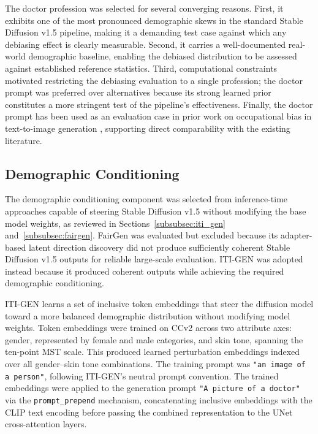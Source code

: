 The doctor profession was selected for several converging reasons. First, it exhibits one of the most pronounced demographic skews in the standard Stable Diffusion v1.5 pipeline, making it a demanding test case against which any debiasing effect is clearly measurable. Second, it carries a well-documented real-world demographic baseline, enabling the debiased distribution to be assessed against established reference statistics. Third, computational constraints motivated restricting the debiasing evaluation to a single profession; the doctor prompt was preferred over alternatives because its strong learned prior constitutes a more stringent test of the pipeline's effectiveness. Finally, the doctor prompt has been used as an evaluation case in prior work on occupational bias in text-to-image generation \cite{Bianchi_2023_TTIGenAmplifiesDemographicStereotypes, Luccioni_2023_AnalyzingSocietalRepresentationsDiffusionModels}, supporting direct comparability with the existing literature.

\subsection{Demographic Conditioning}
\label{subsec:debias_itiGEN}

The demographic conditioning component was selected from inference-time approaches capable of steering Stable Diffusion v1.5 without modifying the base model weights, as reviewed in Sections~\ref{subsubsec:iti_gen} and~\ref{subsubsec:fairgen}. FairGen was evaluated but excluded because its adapter-based latent direction discovery did not produce sufficiently coherent Stable Diffusion v1.5 outputs for reliable large-scale evaluation. ITI-GEN was adopted instead because it produced coherent outputs while achieving the required demographic conditioning.

ITI-GEN \cite{Zhang_2023_ITIGEN} learns a set of inclusive token embeddings that steer the diffusion model toward a more balanced demographic distribution without modifying model weights. Token embeddings were trained on CCv2 \cite{Porgali_2023_CCv2} across two attribute axes: gender, represented by female and male categories, and skin tone, spanning the ten-point MST scale. This produced learned perturbation embeddings indexed over all gender--skin tone combinations. The training prompt was \texttt{"an image of a person"}, following ITI-GEN's neutral prompt convention. The trained embeddings were applied to the generation prompt \texttt{"A picture of a doctor"} via the \texttt{prompt\_prepend} mechanism, concatenating inclusive embeddings with the CLIP text encoding before passing the combined representation to the UNet cross-attention layers.

